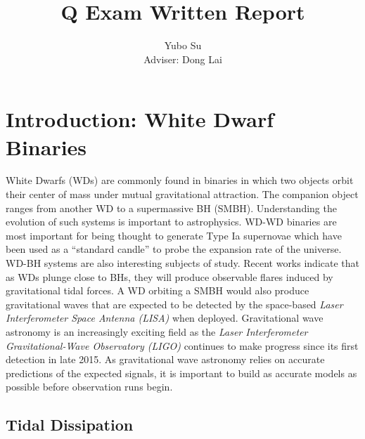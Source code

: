 \documentclass[11pt,
        usenames, %
        dvipsnames %
    ]{article}
\begin{document}
\def\Snospace~{\S{}} %
\renewcommand*{\sectionautorefname}{\Snospace}
\renewcommand*{\appendixautorefname}{\Snospace}
\renewcommand*{\figureautorefname}{Fig.}
\renewcommand*{\equationautorefname}{Eq.}
\renewcommand*{\tableautorefname}{Tab.}

\singlespacing

\pagestyle{fancy}
\rhead{}
\cfoot{\thepage/\pageref{LastPage}}

\title{Q Exam Written Report}
\author{Yubo Su\\
Adviser: Dong Lai}

\maketitle

\section{Introduction: White Dwarf Binaries}

White Dwarfs (WDs) are commonly found in binaries in which two objects orbit
their center of mass under mutual gravitational attraction. The companion object
ranges from another WD to a supermassive BH (SMBH). Understanding the evolution
of such systems is important to astrophysics. WD-WD binaries are most important
for being thought to generate Type Ia supernovae which have been used as a
``standard candle'' to probe the expansion rate of the
universe\cite{darkEnergy}. WD-BH systems are also interesting subjects of study.
Recent works indicate that as WDs plunge close to BHs, they will produce
observable flares induced by gravitational tidal forces\cite{flares}. A WD
orbiting a SMBH would also produce gravitational waves that are expected to be
detected by the space-based \emph{Laser Interferometer Space Antenna (LISA)}
when deployed\cite{lisa}. Gravitational wave astronomy is an increasingly
exciting field as the \emph{Laser Interferometer Gravitational-Wave Observatory
(LIGO)} continues to make progress since its first detection in late 2015. As
gravitational wave astronomy relies on accurate predictions of the expected
signals, it is important to build as accurate models as possible before
observation runs begin.

\subsection{Tidal Dissipation}
\end{document}
